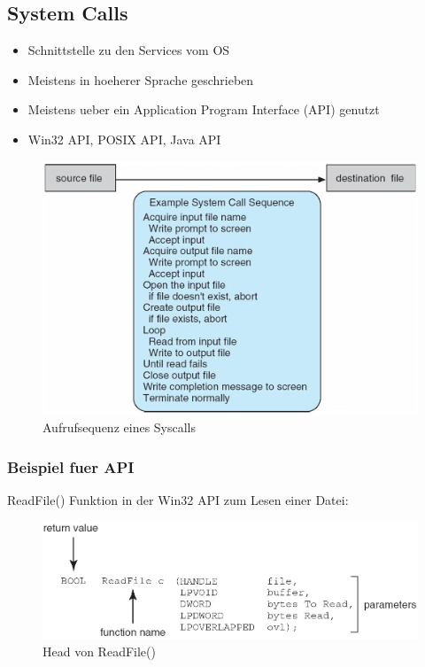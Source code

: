 \documentclass[a4paper]{scrreprt}
\begin{document}
\subsection{System Calls}
\begin{itemize}
	\item Schnittstelle zu den Services vom OS
	\item Meistens in hoeherer Sprache geschrieben
	\item Meistens ueber ein Application Program Interface (API) genutzt
	\item Win32 API, POSIX API, Java API
\end{itemize}

\begin{figure}[ht]
\centering
\includegraphics[scale=0.3]{system_call.png}
\caption{Aufrufsequenz eines Syscalls}
\end{figure}

\subsubsection{Beispiel fuer API}

ReadFile() Funktion in der Win32 API zum Lesen einer Datei:\\

\begin{figure}[ht]
\centering
\includegraphics[scale=0.4]{api.png}
\caption{Head von ReadFile()}
\end{figure}
\end{document}
